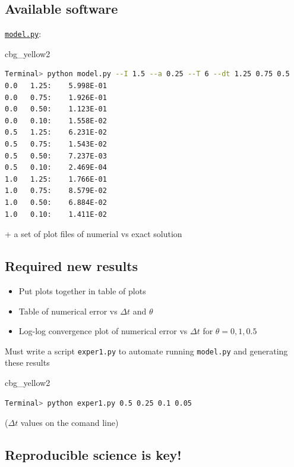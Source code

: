 \documentclass[%
oneside,                 %
final,                   %
10pt]{article}
\newenvironment{_cod_tight}[1]{
   \def\FrameCommand{\colorbox{#1}}
   \FrameRule0.6pt\MakeFramed {\FrameRestore}\vskip3mm}
   {\vskip0mm\endMakeFramed}
\newenvironment{cod}[1]{
\bgroup\rmfamily
\fboxsep=0mm\relax
\begin{_cod_tight}{#1}
\list{}{\parsep=-2mm\parskip=0mm\topsep=0pt\leftmargin=2mm
\rightmargin=2\leftmargin\leftmargin=4pt\relax}
\item\relax}
{\endlist\end{_cod_tight}\egroup}
\begin{document}
\noindent
\subsection*{Available software}

\href{{http://tinyurl.com/nc4upel/doconce_src/model.py}}{\nolinkurl{model.py}}:

\begin{cod}{cbg_yellow2}\begin{lstlisting}[language=bash,style=simple,xleftmargin=2mm]
Terminal> python model.py --I 1.5 --a 0.25 --T 6 --dt 1.25 0.75 0.5
0.0   1.25:    5.998E-01
0.0   0.75:    1.926E-01
0.0   0.50:    1.123E-01
0.0   0.10:    1.558E-02
0.5   1.25:    6.231E-02
0.5   0.75:    1.543E-02
0.5   0.50:    7.237E-03
0.5   0.10:    2.469E-04
1.0   1.25:    1.766E-01
1.0   0.75:    8.579E-02
1.0   0.50:    6.884E-02
1.0   0.10:    1.411E-02
\end{lstlisting}\end{cod}
\noindent

+ a set of plot files of numerial vs exact solution

\subsection*{Required new results}

\begin{itemize}
 \item Put plots together in table of plots

 \item Table of numerical error vs $\Delta t$ and $\theta$

 \item Log-log convergence plot of numerical error vs $\Delta t$ for $\theta=0,1,0.5$
\end{itemize}

\noindent
Must write a script \texttt{exper1.py} to automate running \texttt{model.py}
and generating these results

\begin{cod}{cbg_yellow2}\begin{lstlisting}[language=bash,style=simple,xleftmargin=2mm]
Terminal> python exper1.py 0.5 0.25 0.1 0.05
\end{lstlisting}\end{cod}
\noindent
($\Delta t$ values on the comand line)

\subsection*{Reproducible science is key!}
\end{document}
